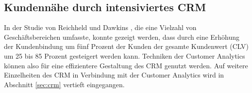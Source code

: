 \subsection{Kundennähe durch intensiviertes CRM}

In der Studie von Reichheld und Dawkins \cite{reichheld1990}, die eine Vielzahl von Geschäftsbereichen umfasste, konnte gezeigt werden, dass durch eine Erhöhung der Kundenbindung um fünf Prozent der Kunden der gesamte Kundenwert (CLV) um 25 bis 85 Prozent gesteigert werden kann. Techniken der Customer Analytics können also für eine effizientere Gestaltung des CRM genutzt werden. Auf weitere Einzelheiten des CRM in Verbindung mit der Customer Analytics wird in Abschnitt \ref{sec:crm} vertieft eingegangen.
